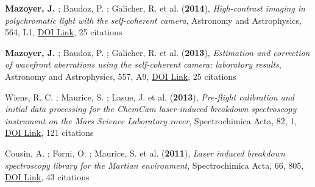 \documentclass[11pt]{article}
\begin{document}
\begin{etaremune}
\item {\bf Mazoyer, J.} ; Baudoz, P. ; Galicher, R. et al. ({\bf2014}), {\it High-contrast imaging in polychromatic light with the self-coherent camera}, Astronomy and Astrophysics, 564, L1, \href{https://doi.org/10.1051/0004-6361/201423375}{DOI Link}, 25 citations

\item {\bf Mazoyer, J.} ; Baudoz, P. ; Galicher, R. et al. ({\bf2013}), {\it Estimation and correction of wavefront aberrations using the self-coherent camera: laboratory results}, Astronomy and Astrophysics, 557, A9, \href{https://doi.org/10.1051/0004-6361/201321706}{DOI Link}, 25 citations

\item Wiens, R. C. ; Maurice, S. ; Lasue, J. et al. ({\bf2013}), {\it Pre-flight calibration and initial data processing for the ChemCam laser-induced breakdown spectroscopy instrument on the Mars Science Laboratory rover}, Spectrochimica Acta, 82, 1, \href{https://doi.org/10.1016/j.sab.2013.02.003}{DOI Link}, 121 citations

\item Cousin, A. ; Forni, O. ; Maurice, S. et al. ({\bf2011}), {\it Laser induced breakdown spectroscopy library for the Martian environment}, Spectrochimica Acta, 66, 805, \href{https://doi.org/10.1016/j.sab.2011.10.004}{DOI Link}, 43 citations

\end{etaremune}
\end{document}
